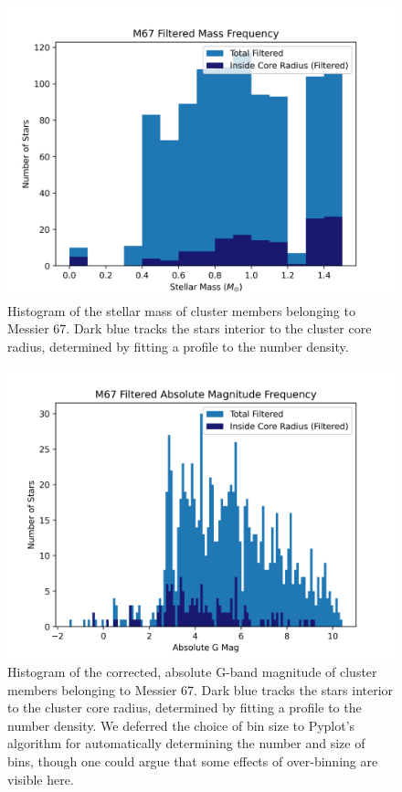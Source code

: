 \documentclass[onecolumn,table,xcdraw,super]{aastex631}
\begin{document}
\begin{figure}[]
    \centering
      \includegraphics[width=4.75in]{figures/M67_massFrequency_filtered.png}
    \caption{Histogram of the stellar mass of cluster members belonging to Messier 67. Dark blue tracks the stars interior to the cluster core radius, determined by fitting a profile to the number density.}
    \label{fig:M67_mass_hist}
\end{figure}

\begin{figure}[]
    \centering
      \includegraphics[width=4.75in]{figures/M67_magFrequency_filtered.png}
    \caption{Histogram of the corrected, absolute G-band magnitude of cluster members belonging to Messier 67. Dark blue tracks the stars interior to the cluster core radius, determined by fitting a profile to the number density. We deferred the choice of bin size to Pyplot's algorithm for automatically determining the number and size of bins, though one could argue that some effects of over-binning are visible here.}
    \label{fig:M67_mag_hist}
\end{figure}
\end{document}

